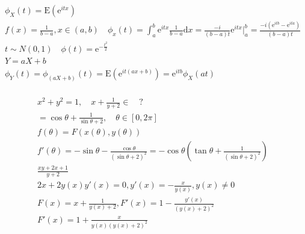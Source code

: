 \documentclass{article}
\begin{document}
\begin{align*}
    \phi_{X}(t) = \mathrm{E}(\mathrm{e}^{itx})\\
    f(x) = \frac{1}{b-a}, x \in (a,b)\quad \phi_{x}(t) = \int_{a}^{b} \mathrm{e}^{itx}\frac{1}{b-a} \mathrm{d}x = \frac{-i}{(b-a)t} \mathrm{e}^{itx} |_{a}^{b} = \frac{-i(\mathrm{e}^{itb}-\mathrm{e}^{ita}) }{(b-a)t}\\
    t \sim N(0,1) \quad \phi(t) = \mathrm{e}^{-\frac{t^2}{2}}\\
    Y = aX + b \\ 
    \phi_{Y}(t) = \phi_{(aX+b)}(t) = \mathrm{E}(\mathrm{e}^{it(ax+b)})=\mathrm{e}^{itb}\phi_{X}(at)\\
\end{align*}

\begin{align*}
    x^2+y^2 = 1, \quad x+\frac{1}{y+2} \in \quad ? \\ 
    = \cos \theta + \frac{1}{\sin \theta + 2}, \quad \theta \in [0,2\pi] \\
    f(\theta) = F(x(\theta),y(\theta)) \\
    f'(\theta) = -\sin \theta-\frac{\cos \theta}{(\sin \theta +2)^2} = -\cos \theta \left(\tan \theta+\frac{1}{(\sin \theta +2)^2} \right)\\
    \frac{xy+2x+1}{y+2}\\
    2x+2y(x)y'(x)=0, y'(x) = -\frac{x}{y(x)} , y(x) \neq 0\\
    F(x) = x + \frac{1}{y(x)+2}, F'(x) = 1-\frac{y'(x)}{(y(x)+2)^2}\\
    F'(x) = 1 + \frac{x}{y(x)(y(x)+2)^2}\\
\end{align*}
\end{document}
